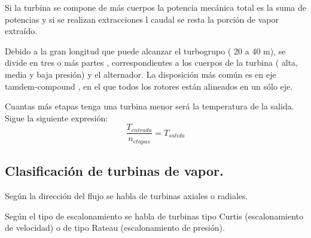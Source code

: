 Si la turbina se compone de más cuerpos la potencia mecánica total es la suma de potencias y si se realizan extracciones l caudal se resta la porción de
vapor extraído.


Debido a la gran longitud que puede alcanzar el turbogrupo ( 20 a 40 m), se divide en tres o
más partes , correspondientes a los cuerpos de la turbina ( alta, media y baja presión) y el alternador. La disposición más común es en eje tamdem-compound , en el que todos los rotores están
alineados en un sólo eje.



Cuantas más etapas tenga una turbina menor será la temperatura de la salida. Sigue la siguiente expresión:
\[\frac{T_ {entrada}}{n_{etapas}}=T_{salida}\]
\subsection{Clasificación de turbinas de vapor.}
Según la dirección del flujo se habla de turbinas axiales o radiales.


Según el tipo de escalonamiento se habla de turbinas tipo Curtis (escalonamiento de velocidad) o de tipo Rateau (escalonamiento de presión). 


